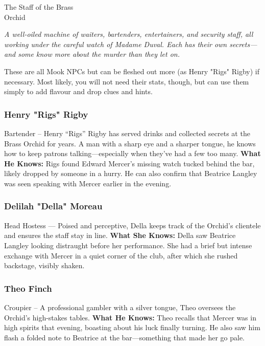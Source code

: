 \begin{NPC}[description=The people who keep the Orchid running]{The Staff of the Brass\\Orchid}
	
    \emph{A well-oiled machine of waiters, bartenders, entertainers, and security staff, all working under the careful watch of Madame Duval. Each has their own secrets—and some know more about the murder than they let on.}
    
	\vspace{0.8\baselineskip}
    \begin{GmTips}[background=bgtan]
    These are all Mook NPCs but can be fleshed out more (as Henry "Rigs" Rigby) if necessary. Most likely, you will not need their stats, though, but can use them simply to add flavour and drop clues and hints.
    \end{GmTips}
    
    \subsubsection*{Henry "Rigs" Rigby}
    Bartender – Henry “Rigs” Rigby has served drinks and collected secrets at the Brass Orchid for years. A man with a sharp eye and a sharper tongue, he knows how to keep patrons talking—especially when they’ve had a few too many.
    \textbf{What He Knows:} Rigs found Edward Mercer’s missing watch tucked behind the bar, likely dropped by someone in a hurry. He can also confirm that Beatrice Langley was seen speaking with Mercer earlier in the evening.

    
	\subsubsection*{Delilah "Della" Moreau}
	Head Hostess --- Poised and perceptive, Della keeps track of the Orchid’s clientele and ensures the staff stay in line.  
	\textbf{What She Knows:} Della saw Beatrice Langley looking distraught before her performance. She had a brief but intense exchange with Mercer in a quiet corner of the club, after which she rushed backstage, visibly shaken.

	\subsubsection*{Theo Finch}
	Croupier – A professional gambler with a silver tongue, Theo oversees the Orchid’s high-stakes tables.
	\textbf{What He Knows:} Theo recalls that Mercer was in high spirits that evening, boasting about his luck finally turning. He also saw him flash a folded note to Beatrice at the bar—something that made her go pale.


\end{NPC}
